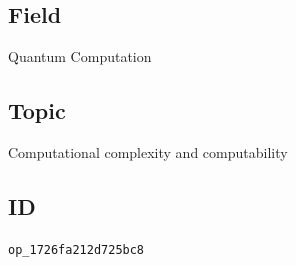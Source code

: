 \subsection*{Field}

Quantum Computation

\subsection*{Topic}

Computational complexity and computability

\subsection*{ID}

\texttt{op\_1726fa212d725bc8}
